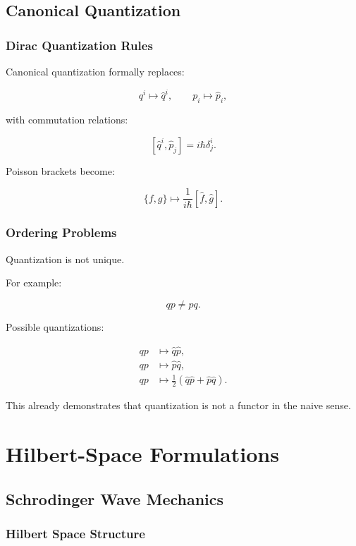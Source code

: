 \documentclass[11pt]{book}
\begin{document}
\chapter{Canonical Quantization}

\section{Dirac Quantization Rules}

Canonical quantization formally replaces:

\[
q^i \mapsto \hat q^i,
\qquad
p_i \mapsto \hat p_i,
\]

with commutation relations:

\[
[\hat q^i,\hat p_j]
=
i\hbar \delta^i_j.
\]

Poisson brackets become:

\[
\{f,g\}
\mapsto
\frac{1}{i\hbar}[\hat f,\hat g].
\]

\section{Ordering Problems}

Quantization is not unique.

For example:

\[
qp \neq pq.
\]

Possible quantizations:

\begin{align}
qp &\mapsto \hat q \hat p,\\
qp &\mapsto \hat p \hat q,\\
qp &\mapsto \frac12(\hat q\hat p+\hat p\hat q).
\end{align}

This already demonstrates that quantization is not a functor in the naive sense.

\part{Hilbert-Space Formulations}

\chapter{Schrodinger Wave Mechanics}

\section{Hilbert Space Structure}
\end{document}
